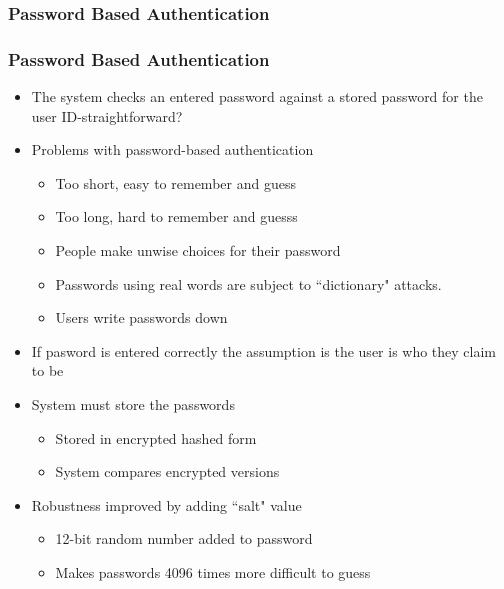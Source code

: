 \documentclass{beamer}
\begin{document}
\subsubsection{Password Based Authentication}
\begin{frame}
\frametitle{Password Based Authentication}
\begin{itemize}
\item The system checks an entered password against a stored password for the user ID-straightforward?
\item Problems with password-based authentication
\begin{itemize}
\item Too short, easy to remember and guess
\item Too long, hard to remember and guesss
\item People make unwise choices for their password
\item Passwords using real words are subject to ``dictionary" attacks.
\item Users write passwords down
\end{itemize}
\item If pasword is entered correctly the assumption is the user is who they claim to be
\item System must store the passwords
\begin{itemize}
\item Stored in encrypted hashed form
\item System compares encrypted versions
\end{itemize}
\item Robustness improved by adding ``salt" value
\begin{itemize}
\item 12-bit random number added to password
\item Makes passwords 4096 times more difficult to guess
\end{itemize}
\end{itemize}
\end{frame}

\end{document}
